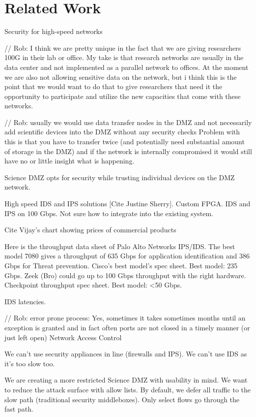 \section{Related Work}

Security for high-speed networks

// Rob: I think we are pretty unique in the fact that we are giving researchers 100G in their lab or office. My take is that research networks are usually in the data center and not implemented as a parallel network to offices. At the moment we are also not allowing sensitive data on the network, but i think this is the point that we would want to do that to give researchers that need it the opportunity to participate and utilize the new capacities that come with these networks.

// Rob: usually we would use data transfer nodes in the DMZ and not necessarily add scientific devices into the DMZ without any security checks
Problem with this is that you have to transfer twice  (and potentially need substantial amount of storage in the DMZ) and if the network is internally compromised it would still have no or little insight what is happening.


Science DMZ opts for security while trusting individual devices on the DMZ network.

High speed IDS and IPS solutions [Cite Justine Sherry]. Custom FPGA. IDS and IPS on 100 Gbps. Not sure how to integrate into the existing system.

Cite Vijay’s chart showing prices of commercial products

Here is the throughput data sheet of Palo Alto Networks IPS/IDS. The best model 7080 gives a throughput of 635 Gbps for application identification and 386 Gbps for Threat prevention.
Cisco's best model's spec sheet. Best model: 235 Gbps.
Zeek (Bro) could go up to 100 Gbps throughput with the right hardware.
Checkpoint throughput spec sheet. Best model: <50 Gbps.

IDS latencies.

// Rob: error prone process: Yes, sometimes it takes sometimes months until an exception is granted and in fact often ports are not closed in a timely manner (or just left open)
Network Access Control

We can’t use security appliances in line (firewalls and IPS). We can’t use IDS as it’s too slow too.

We are creating a more restricted Science DMZ with usability in mind. We want to reduce the attack surface with allow lists. By default, we defer all traffic to the slow path (traditional security middleboxes). Only select flows go through the fast path.

